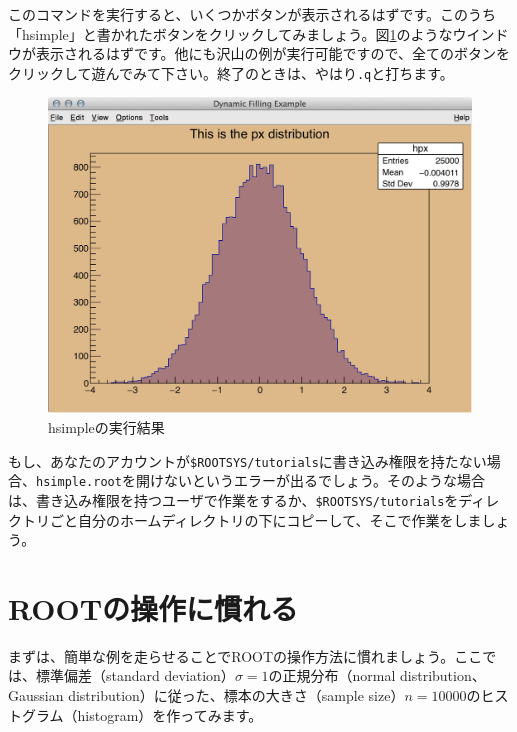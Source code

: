 {このコマンドを実行すると、いくつかボタンが表示されるはずです。このうち「hsimple」と書かれたボタンをクリックしてみましょう。図\ref{fig:hsimple}のようなウインドウが表示されるはずです。他にも沢山の例が実行可能ですので、全てのボタンをクリックして遊んでみて下さい。終了のときは、やはり\texttt{.q}と打ちます。

\begin{figure}
  \centering
  \includegraphics[width=12cm]{fig/hsimple.png}
  \caption{hsimpleの実行結果}
  \label{fig:hsimple}
\end{figure}

もし、あなたのアカウントが\texttt{\$ROOTSYS/tutorials}に書き込み権限を持たない場合、\texttt{hsimple.root}を開けないというエラーが出るでしょう。そのような場合は、書き込み権限を持つユーザで作業をするか、\texttt{\$ROOTSYS/tutorials}をディレクトリごと自分のホームディレクトリの下にコピーして、そこで作業をしましょう。

\section{ROOTの操作に慣れる}

まずは、簡単な例を走らせることでROOTの操作方法に慣れましょう。ここでは、標準偏差（standard deviation）$\sigma=1$の正規分布（normal distribution、Gaussian distribution）に従った、標本の大きさ（sample size）$n=10000$のヒストグラム（histogram）を作ってみます。

}
